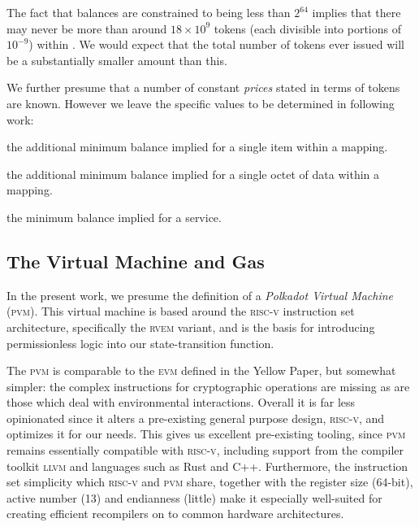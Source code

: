 The fact that balances are constrained to being less than $2^{64}$ implies that there may never be more than around $18\times10^{9}$ tokens (each divisible into portions of $10^{-9}$) within \Jam. We would expect that the total number of tokens ever issued will be a substantially smaller amount than this.

We further presume that a number of constant \emph{prices} stated in terms of tokens are known. However we leave the specific values to be determined in following work:

\begin{description}\label{eq:prices}
  \item[$\mathsf{B}_I$] the additional minimum balance implied for a single item within a mapping.
  \item[$\mathsf{B}_L$] the additional minimum balance implied for a single octet of data within a mapping.
  \item[$\mathsf{B}_S$] the minimum balance implied for a service.
\end{description}




















\subsection{The Virtual Machine and Gas}\label{sec:virtualmachineandgas}

In the present work, we presume the definition of a \emph{Polkadot Virtual Machine} (\textsc{pvm}). This virtual machine is based around the \textsc{risc-v} instruction set architecture, specifically the \textsc{rv}\textsc{em} variant, and is the basis for introducing permissionless logic into our state-transition function.

The \textsc{pvm} is comparable to the \textsc{evm} defined in the Yellow Paper, but somewhat simpler: the complex instructions for cryptographic operations are missing as are those which deal with environmental interactions. Overall it is far less opinionated since it alters a pre-existing general purpose design, \textsc{risc-v}, and optimizes it for our needs. This gives us excellent pre-existing tooling, since \textsc{pvm} remains essentially compatible with \textsc{risc-v}, including support from the compiler toolkit \textsc{llvm} and languages such as Rust and C++. Furthermore, the instruction set simplicity which \textsc{risc-v} and \textsc{pvm} share, together with the register size (64-bit), active number (13) and endianness (little) make it especially well-suited for creating efficient recompilers on to common hardware architectures.

